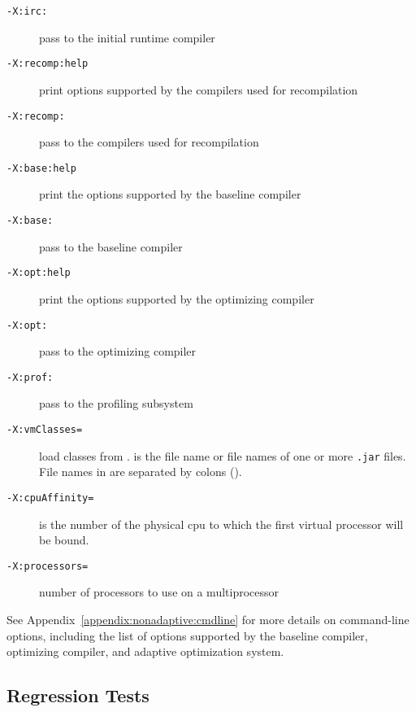 \begin{description}
\item[{\tt -X:irc:}]
pass  to the initial runtime compiler

\item[{\tt -X:recomp\Mlsq{}:help\Mrsq{}}]
print options supported by the compilers used for recompilation

\item[{\tt -X:recomp:}]
pass  to the compilers used for recompilation

\item[{\tt -X:base\Mlsq{}:help\Mrsq{}}]
print the options supported by the baseline compiler

\item[{\tt -X:base:}]
pass  to the baseline compiler

\item[{\tt -X:opt\Mlsq{}:help\Mrsq{}}]
print the options supported by the optimizing compiler

\item[{\tt -X:opt:}]
pass  to the optimizing compiler

\item[{\tt -X:prof:}]
pass  to the profiling subsystem

\item[{\tt -X:vmClasses=}]
load classes from .   is the file name or
file names of one or more {\tt .jar} files.  File names in
 are separated by colons (\Mlitch{:}).

\item[{\tt -X:cpuAffinity=}]
 is the number of the physical cpu to which the first virtual processor will be bound.

\item[{\tt -X:processors=\Mlsq{}  \Mor{}  \Mrsq{}}]
number of processors to use on a multiprocessor

\end{description}

See Appendix~\ref{appendix:nonadaptive:cmdline} for more details on 
command-line options, including the list of options supported by the 
baseline compiler, optimizing compiler, and adaptive optimization system.

\JikesTMFooter

\JavaTMFooter

\subsection{Regression Tests}
\label{regression}

